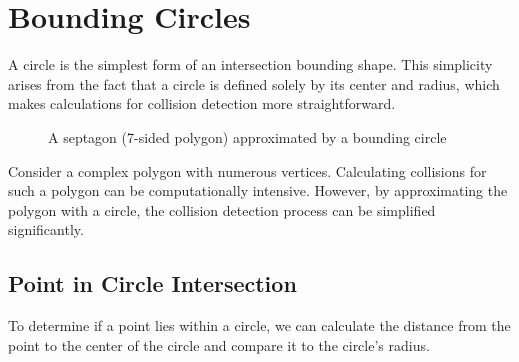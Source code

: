 \section{Bounding Circles}
A circle is the simplest form of an intersection bounding shape. This
simplicity arises from the fact that a circle is defined solely by its center
and radius, which makes calculations for collision detection more
straightforward.
\begin{figure}[H]
    \begin{center}
    \end{center}
    \caption{A septagon (7-sided polygon) approximated by a bounding circle}
\end{figure}

Consider a complex polygon with numerous vertices. Calculating collisions for
such a polygon can be computationally intensive. However, by approximating the
polygon with a circle, the collision detection process can be simplified
significantly.

\subsection{Point in Circle Intersection}
To determine if a point lies within a circle, we can calculate the distance
from the point to the center of the circle and compare it to the circle's
radius.

